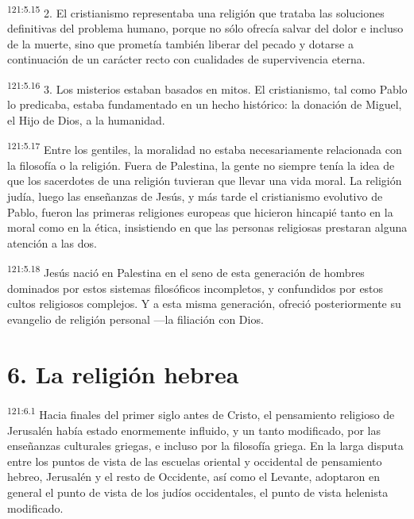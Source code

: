 \par 
\textsuperscript{121:5.15} 2. El cristianismo representaba una religión que trataba las soluciones definitivas del problema humano, porque no sólo ofrecía salvar del dolor e incluso de la muerte, sino que prometía también liberar del pecado y dotarse a continuación de un carácter recto con cualidades de supervivencia eterna.

\par 
\textsuperscript{121:5.16} 3. Los misterios estaban basados en mitos. El cristianismo, tal como Pablo lo predicaba, estaba fundamentado en un hecho histórico: la donación de Miguel, el Hijo de Dios, a la humanidad.

\par 
\textsuperscript{121:5.17} Entre los gentiles, la moralidad no estaba necesariamente relacionada con la filosofía o la religión. Fuera de Palestina, la gente no siempre tenía la idea de que los sacerdotes de una religión tuvieran que llevar una vida moral. La religión judía, luego las enseñanzas de Jesús, y más tarde el cristianismo evolutivo de Pablo, fueron las primeras religiones europeas que hicieron hincapié tanto en la moral como en la ética, insistiendo en que las personas religiosas prestaran alguna atención a las dos.

\par 
\textsuperscript{121:5.18} Jesús nació en Palestina en el seno de esta generación de hombres dominados por estos sistemas filosóficos incompletos, y confundidos por estos cultos religiosos complejos. Y a esta misma generación, ofreció posteriormente su evangelio de religión personal ---la filiación con Dios.

\section*{6. La religión hebrea}
\par 
\textsuperscript{121:6.1} Hacia finales del primer siglo antes de Cristo, el pensamiento religioso de Jerusalén había estado enormemente influido, y un tanto modificado, por las enseñanzas culturales griegas, e incluso por la filosofía griega. En la larga disputa entre los puntos de vista de las escuelas oriental y occidental de pensamiento hebreo, Jerusalén y el resto de Occidente, así como el Levante, adoptaron en general el punto de vista de los judíos occidentales, el punto de vista helenista modificado.


